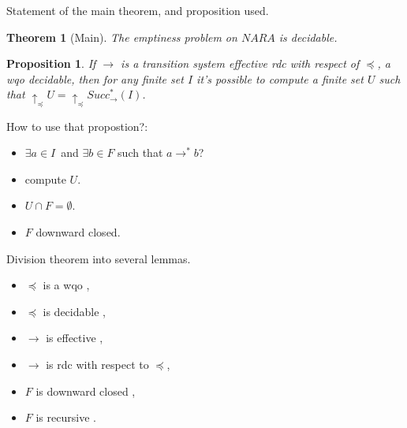 \documentclass{beamer}
\newtheorem{thr}{Theorem} %
\newtheorem{pp}{Proposition}
\begin{document}
\begin{frame}{Statement of the main theorem, and proposition used.}
\begin{thr}[Main]
 The emptiness problem on $NARA$ is decidable.
\end{thr}
  \pause
 \begin{pp} 
   If  $\rightarrow$ is a transition system effective rdc with respect of $\preceq$, a wqo decidable, then for any finite set $I$ it's possible to compute a finite set $U$ such that
   $\uparrow_\preceq U=\uparrow_\preceq Succ^*_\rightarrow (I)$.
 \end{pp}
\pause
How to use that propostion?:
\begin{itemize}
\pause
 \item $\exists a \in I$\ and $\exists b \in F$ such that $ a \rightarrow^* b $? \pause
 \item compute $U$. \pause
 \item $U \cap F = \emptyset$. \pause
 \item $F$ downward closed.
\end{itemize}


\end{frame}


\begin{frame}{Division theorem into several lemmas.}
 \begin{itemize}
 \item $\preceq$ is a wqo ,
 	\item $\preceq$ is decidable ,
 	\item $\rightarrow$ is effective ,
	\item $\rightarrow$ is rdc with respect to $\preceq$,
 	\item $F$ is downward closed ,
 	\item $F$ is recursive .
  \end{itemize}
\end{frame}



% 
\end{document}
